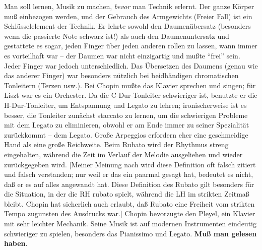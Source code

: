 Man soll lernen, Musik zu machen, \textit{bevor} man Technik erlernt.
Der ganze Körper muß einbezogen werden, und der Gebrauch des Armgewichts (Freier Fall) ist ein Schlüsselelement der Technik.
Er lehrte sowohl den Daumenübersatz (besonders wenn die passierte Note schwarz ist!) als auch den Daumenuntersatz und gestattete es sogar, jeden Finger über jeden anderen rollen zu lassen, wann immer es vorteilhaft war -- der Daumen war nicht einzigartig und mußte \enquote{frei} sein.
Jeder Finger war jedoch unterschiedlich.
Das Übersetzen des Daumens (genau wie das anderer Finger) war besonders nützlich bei beidhändigen chromatischen Tonleitern (Terzen usw.).
Bei Chopin mußte das Klavier sprechen und singen; für Liszt war es ein Orchester.
Da die C-Dur-Tonleiter schwieriger ist, benutzte er die H-Dur-Tonleiter, um Entspannung und Legato zu lehren; ironischerweise ist es besser, die Tonleiter zunächst staccato zu lernen, um die schwierigen Probleme mit dem Legato zu eliminieren, obwohl er am Ende immer zu seiner Spezialität zurückkommt -- dem Legato.
Große Arpeggios erfordern eher eine geschmeidige Hand als eine große Reichweite.
Beim Rubato wird der Rhythmus streng eingehalten, während die Zeit im Verlauf der Melodie ausgeliehen und wieder zurückgegeben wird.
[Meiner Meinung nach wird diese Definition oft falsch zitiert und falsch verstanden; nur weil er das ein paarmal gesagt hat, bedeutet es nicht, daß er es auf alles angewandt hat.
Diese Definition des Rubato gilt besonders für die Situation, in der die RH rubato spielt, während die LH im strikten Zeitmaß bleibt.
Chopin hat sicherlich auch erlaubt, daß Rubato eine Freiheit vom strikten Tempo zugunsten des Ausdrucks war.]
Chopin bevorzugte den Pleyel, ein Klavier mit sehr leichter Mechanik.
Seine Musik ist auf modernen Instrumenten eindeutig schwieriger zu spielen, besonders das Pianissimo und Legato.
\textbf{Muß man gelesen haben}.


\label{Fink}

